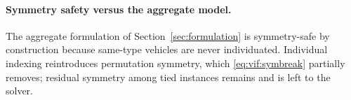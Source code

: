 \paragraph{Symmetry safety versus the aggregate model.}
The aggregate formulation of Section~\ref{sec:formulation} is symmetry-safe by
construction because same-type vehicles are never individuated. Individual
indexing reintroduces permutation symmetry, which \eqref{eq:vif:symbreak}
partially removes; residual symmetry among tied instances remains and is left
to the solver.
